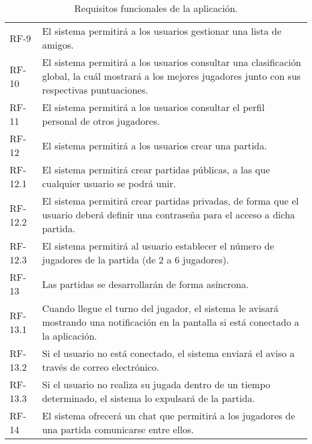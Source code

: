 \documentclass[11pt, a4paper, titlepage]{article}
\begin{document}
\begin{table}[h!]
\begin{tabularx}{\textwidth}{|l|X|}
         RF-9 & El sistema permitirá a los usuarios gestionar una lista de amigos.\\
         RF-10 & El sistema permitirá a los usuarios consultar una clasificación global, la cuál mostrará a los mejores jugadores junto con sus respectivas puntuaciones.\\
         RF-11 & El sistema permitirá a los usuarios consultar el perfil personal de otros jugadores.\\
         RF-12 & El sistema permitirá a los usuarios crear una partida.\\
         RF-12.1 & El sistema permitirá crear partidas públicas, a las que cualquier usuario se podrá unir.\\
         RF-12.2 & El sistema permitirá crear partidas privadas, de forma que el usuario deberá definir una contraseña para el acceso a dicha partida.\\
         RF-12.3 & El sistema permitirá al usuario establecer el número de jugadores de la partida (de 2 a 6 jugadores).\\
         RF-13 & Las partidas se desarrollarán de forma asíncrona.\\
         RF-13.1 & Cuando llegue el turno del jugador, el sistema le avisará mostrando una notificación en la pantalla si está conectado a la aplicación.\\
         RF-13.2 & Si el usuario no está conectado, el sistema enviará el aviso a través de correo electrónico.\\
         RF-13.3 & Si el usuario no realiza su jugada dentro de un tiempo determinado, el sistema lo expulsará de la partida.\\
         RF-14 & El sistema ofrecerá un chat que permitirá a los jugadores de una partida comunicarse entre ellos.\\
         \hline
    \end{tabularx}
    \caption{Requisitos funcionales de la aplicación.}
    \label{tab:rf}
\end{table}
\end{document}

